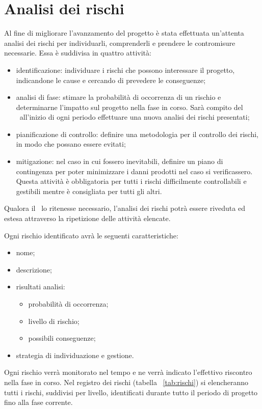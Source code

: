 \documentclass[../PianoProgetto.tex]{subfiles}
\begin{document}
\section{Analisi dei rischi}

	Al fine di migliorare l'avanzamento del progetto è stata effettuata un'attenta analisi dei rischi per individuarli, comprenderli e prendere le contromisure necessarie. Essa è suddivisa in quattro attività:
	\begin{itemize}
	\item identificazione: individuare i rischi che possono interessare il progetto, indicandone le cause e cercando di prevedere le conseguenze;
	\item analisi di fase: stimare la probabilità di occorrenza di un rischio e determinarne l'impatto sul progetto nella fase in corso. Sarà compito del \responsabilediprogetto\  all'inizio di ogni periodo effettuare una nuova analisi dei rischi presentati;
	\item pianificazione di controllo: definire una metodologia per il controllo dei rischi, in modo che possano essere evitati;
	\item mitigazione: nel caso in cui fossero inevitabili, definire un piano di contingenza per poter minimizzare i danni prodotti nel caso si verificassero. Questa attività è obbligatoria per tutti i rischi difficilmente controllabili e gestibili mentre è consigliata per tutti gli altri.
	\end{itemize}
    Qualora il \responsabilediprogetto\ lo ritenesse necessario, l'analisi dei rischi potrà essere riveduta ed estesa attraverso la ripetizione delle attività elencate.

	Ogni rischio identificato avrà le seguenti caratteristiche: 
		\begin{itemize}
			\item nome;
			\item descrizione; 
			\item risultati analisi:
			\begin{itemize}
				\item probabilità di occorrenza;
				\item livello di rischio;
				\item possibili conseguenze;
			\end{itemize}
			\item strategia di individuazione e gestione.
		\end{itemize}	
	Ogni rischio verrà monitorato nel tempo e ne verrà indicato l'effettivo riscontro nella fase in corso.
    Nel registro dei rischi (tabella ~\ref{tab:rischi}) si elencheranno tutti i rischi, suddivisi per livello, identificati durante tutto il periodo di progetto fino alla fase corrente.
		
\end{document}
